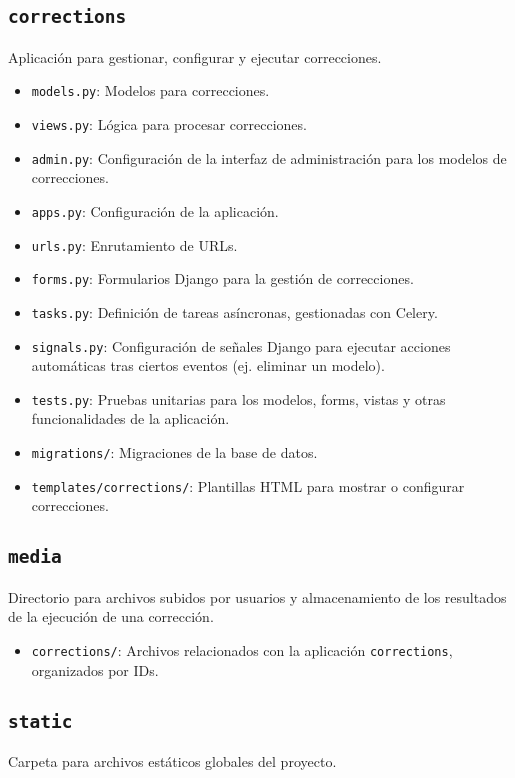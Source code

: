 \subsection{\texttt{corrections}}
Aplicación para gestionar, configurar y ejecutar correcciones.

\begin{itemize}
    \item \texttt{models.py}: Modelos para correcciones.
    \item \texttt{views.py}: Lógica para procesar correcciones.
    \item \texttt{admin.py}: Configuración de la interfaz de administración para los modelos de correcciones.
    \item \texttt{apps.py}: Configuración de la aplicación.
    \item \texttt{urls.py}: Enrutamiento de URLs.
    \item \texttt{forms.py}: Formularios Django para la gestión de correcciones.
    \item \texttt{tasks.py}: Definición de tareas asíncronas, gestionadas con Celery.
    \item \texttt{signals.py}: Configuración de señales Django para ejecutar acciones automáticas tras ciertos eventos (ej. eliminar un modelo).
    \item \texttt{tests.py}: Pruebas unitarias para los modelos, forms, vistas y otras funcionalidades de la aplicación.
    \item \texttt{migrations/}: Migraciones de la base de datos.
    \item \texttt{templates/corrections/}: Plantillas HTML para mostrar o configurar correcciones.
\end{itemize}

\subsection{\texttt{media}}
Directorio para archivos subidos por usuarios y almacenamiento de los resultados de la ejecución de una corrección.

\begin{itemize}
    \item \texttt{corrections/}: Archivos relacionados con la aplicación \texttt{corrections}, organizados por IDs.
\end{itemize}

\subsection{\texttt{static}}
Carpeta para archivos estáticos globales del proyecto.

